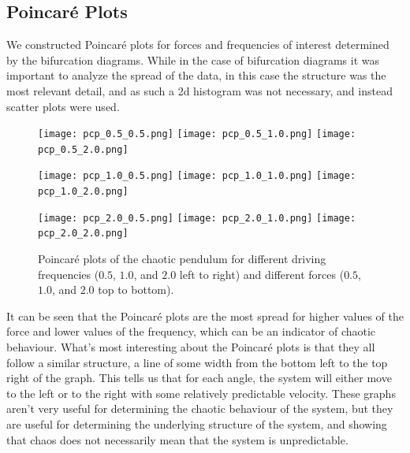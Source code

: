 \documentclass[11pt]{article} %
\begin{document}
    \subsection{Poincar\'e Plots}
    We constructed Poincar\'e plots for forces and frequencies of interest determined by the bifurcation diagrams. While in the case of bifurcation
    diagrams it was important to analyze the spread of the data, in this case the structure was the most relevant detail, and as such a 2d histogram
    was not necessary, and instead scatter plots were used.
    \begin{figure}[H]
        \centering
        \texttt{[image: pcp\_0.5\_0.5.png]}
        \texttt{[image: pcp\_0.5\_1.0.png]}
        \texttt{[image: pcp\_0.5\_2.0.png]}
    \end{figure}
    \begin{figure}[H]
        \centering
        \texttt{[image: pcp\_1.0\_0.5.png]}
        \texttt{[image: pcp\_1.0\_1.0.png]}
        \texttt{[image: pcp\_1.0\_2.0.png]}
    \end{figure}
    \begin{figure}[H]
        \centering
        \texttt{[image: pcp\_2.0\_0.5.png]}
        \texttt{[image: pcp\_2.0\_1.0.png]}
        \texttt{[image: pcp\_2.0\_2.0.png]}
        \caption{Poincar\'e plots of the chaotic pendulum for different driving frequencies ($0.5$, $1.0$, and $2.0$ left to right) and different
        forces ($0.5$, $1.0$, and $2.0$ top to bottom).}
    \end{figure}
    It can be seen that the Poincar\'e plots are the most spread for higher values of the force and lower values of the frequency, which can be
    an indicator of chaotic behaviour. What's most interesting about the Poincar\'e plots is that they all follow a similar structure, a line of
    some width from the bottom left to the top right of the graph. This tells us that for each angle, the system will either move to the left or
    to the right with some relatively predictable velocity. These graphs aren't very useful for determining the chaotic behaviour of the system,
    but they are useful for determining the underlying structure of the system, and showing that chaos does not necessarily mean that the system
    is unpredictable.\\
\end{document}
